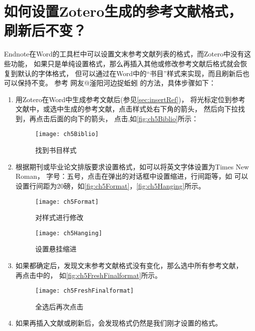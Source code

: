 \documentclass[cn,11pt,chinese]{elegantbook}
\begin{document}
		\section{如何设置Zotero生成的参考文献格式，刷新后不变？}\label{sec:refresh}
			Endnote在Word的工具栏中可以设置文末参考文献列表的格式，而Zotero中没有这些功能，
			如果只是单纯设置格式，那么再插入其他或修改参考文献后格式就会恢复到默认的字体格式，
			但可以通过在Word中的“书目”样式来实现，而且刷新后也可以保持不变。
			参考 网友@滏阳河边捉蚯蚓 的方法，具体步骤如下：
			\begin{enumerate}
				\item
				用Zotero在Word中生成参考文献后(参见\cref{sec:insertRef})，
				将光标定位到参考文献中，或选中生成的参考文献，点击样式处右下角的箭头，
				然后向下拉找到\menu{书目}，再点击后面的向下的箭头，
				点击,如\autoref{fig:ch5Biblio}所示：
		    		\begin{figure}[htbp]
			    		\centering
			    		\texttt{[image: ch5Biblio]}
			    		\caption{找到书目样式}
			    		\label{fig:ch5Biblio}
		    	  \end{figure}
		    	\item
				根据期刊或毕业论文排版要求设置格式，如可以将英文字体设置为Times New Roman，
				字号：五号，点击在弹出的对话框中设置缩进，行间距等，如
				可以设置行间距为20磅，如\autoref{fig:ch5Format}，\autoref{fig:ch5Hanging}所示。
			    	\begin{figure}[t]
			    		\centering
			    		\texttt{[image: ch5Format]}
			    		\caption{对样式进行修改}
			    		\label{fig:ch5Format}
			    	\end{figure}
		    	 
			    	\begin{figure}[htbp]
			    		\centering
			    		\texttt{[image: ch5Hanging]}
			    		\caption{设置悬挂缩进}
			    		\label{fig:ch5Hanging}
			    	\end{figure}
		    	\item
				 如果都确定后，发现文末参考文献格式没有变化，那么选中所有参考文献，
				 再点击中的，
				 如\autoref{fig:ch5FreshFinalformat}所示。
			    	\begin{figure}[htbp]
			    		\centering
			    		\texttt{[image: ch5FreshFinalformat]}
			    		\caption{全选后再次点击}
			    		\label{fig:ch5FreshFinalformat}
			    	\end{figure}
		    	\item
		    	如果再插入文献或刷新后，会发现格式仍然是我们刚才设置的格式。
			\end{enumerate}
			
\end{document}
